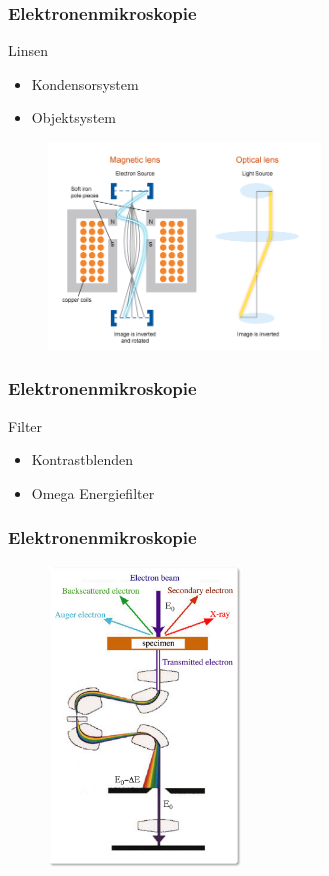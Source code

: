 \begin{frame}
	\frametitle{Elektronenmikroskopie}
	\begin{block}{Linsen}
		\begin{itemize}
			\item Kondensorsystem
			\item Objektsystem
		\end{itemize}
	\end{block}
	\begin{figure}
		\includegraphics[height = 5.5cm]{pic/lens.png}
	\end{figure}
\end{frame}

\begin{frame}
	\frametitle{Elektronenmikroskopie}
	\begin{block}{Filter}
		\begin{itemize}
			\item Kontrastblenden
			\item Omega Energiefilter
		\end{itemize}		
	\end{block}
\end{frame}

\begin{frame}
	\frametitle{Elektronenmikroskopie}
	\begin{figure}
		\includegraphics[height = 8cm]{pic/omega.jpg}
	\end{figure}
\end{frame}

